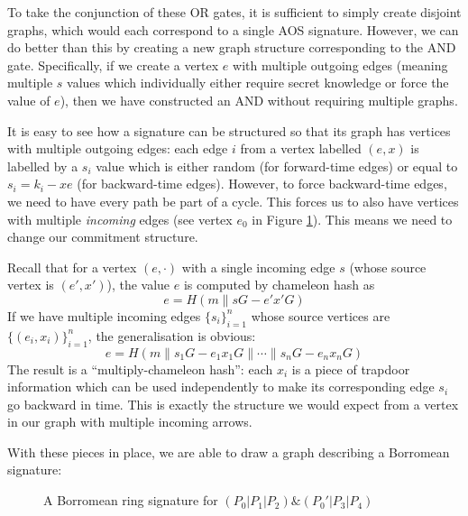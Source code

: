 \documentclass[letterpaper]{article}
\begin{document}
To take the conjunction of these OR gates, it is sufficient to simply create
disjoint graphs, which would each correspond to a single AOS signature. However,
we can do better than this by creating a new graph structure corresponding to
the AND gate. Specifically, if we create a vertex $e$ with multiple outgoing edges
(meaning multiple $s$ values which individually either require secret knowledge
or force the value of $e$), then we have constructed an AND without requiring
multiple graphs.

It is easy to see how a signature can be structured so that its graph has
vertices with multiple outgoing edges: each edge $i$ from a vertex labelled
$(e,x)$ is labelled by a $s_i$ value which is either random (for forward-time
edges) or equal to $s_i = k_i - xe$ (for backward-time edges). However, to
force backward-time edges, we need to have every path be part of a cycle. This
forces us to also have vertices with multiple \emph{incoming} edges (see vertex
$e_0$ in Figure \ref{fig2}). This means we need to change our commitment structure.

Recall that for a vertex $(e,\cdot)$ with a single incoming edge $s$ (whose source
vertex is $(e',x')$), the value $e$ is computed by chameleon hash as
\[ e = H(m\| sG - e'x'G) \]
If we have multiple incoming edges $\{s_i\}_{i=1}^n$ whose source vertices are
$\{(e_i,x_i)\}_{i=1}^n$, the generalisation is obvious:
\[ e = H(m\| s_1G - e_1x_1G \| \cdots \| s_nG - e_nx_nG) \]
The result is a ``multiply-chameleon hash'': each $x_i$ is a piece of trapdoor
information which can be used independently to make its corresponding edge $s_i$
go backward in time. This is exactly the structure we would expect from a vertex
in our graph with multiple incoming arrows.
\clearpage

With these pieces in place, we are able to draw a graph describing a Borromean
signature:
\begin{figure}[H]
\begin{center}
\end{center}
\caption{A Borromean ring signature for $(P_0 | P_1 | P_2) \& (P_0' | P_3 | P_4)$\label{fig2}}
\end{figure}
\end{document}
